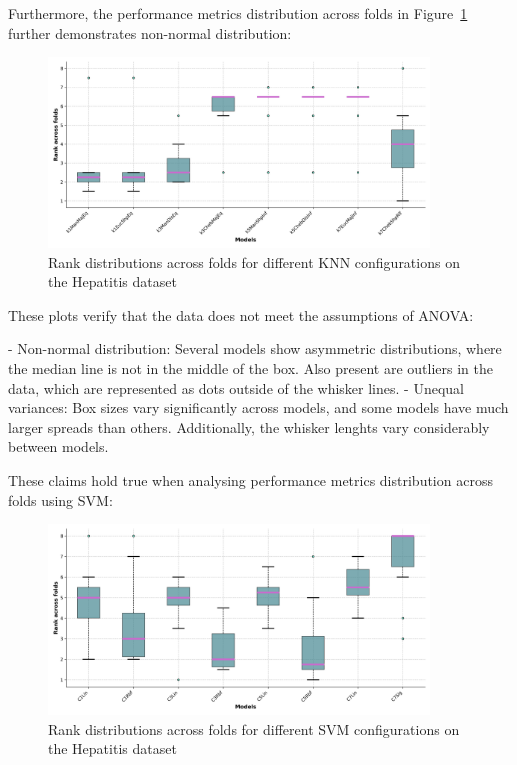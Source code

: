 Furthermore, the performance metrics distribution across folds in Figure~\ref{fig:ranked-folds-knn-hepatitis} further demonstrates non-normal distribution:

\begin{figure}[!ht]
    \centering
    \includegraphics[width=0.9\textwidth]{figures/ranked_folds_KNN_hepatitis.png}
    \caption{Rank distributions across folds for different KNN configurations on the Hepatitis dataset}
\label{fig:ranked-folds-knn-hepatitis}
\end{figure}

These plots verify that the data does not meet the assumptions of ANOVA:

- Non-normal distribution: Several models show asymmetric distributions, where the median line is not in the middle of the box.
Also present are outliers in the data, which are represented as dots outside of the whisker lines.
- Unequal variances: Box sizes vary significantly across models, and some models have much larger spreads than others.
Additionally, the whisker lenghts vary considerably between models.

These claims hold true when analysing performance metrics distribution across folds using SVM:

\begin{figure}[!ht]
    \centering
    \includegraphics[width=0.9\textwidth]{figures/ranked_folds_SVM_hepatitis.png}
    \caption{Rank distributions across folds for different SVM configurations on the Hepatitis dataset}
\label{fig:ranked-folds-svm-hepatitis}
\end{figure}

